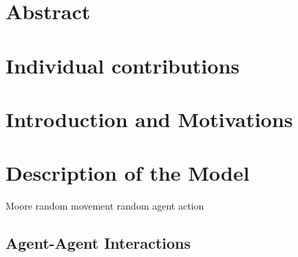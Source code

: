 \documentclass[11pt]{article}
\begin{document}
\section{Abstract}

\section{Individual contributions}

\section{Introduction and Motivations}

\section{Description of the Model}
Moore 
random movement
random agent action
\subsection{Agent-Agent Interactions}
\end{document}
